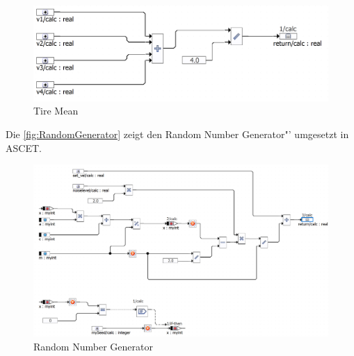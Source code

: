 \begin{figure}[h!]
	\centering
	\includegraphics[width=1\linewidth]{../Graphiken/TireMean.png}
	\caption{Tire Mean}
	\label{fig:TireMean}
\end{figure}

\pagebreak
Die \autoref{fig:RandomGenerator} zeigt den \glqq Random Number Generator"' umgesetzt in ASCET.

\begin{figure}[h!]
	\centering
	\includegraphics[width=1\linewidth]{../Graphiken/RandomGenerator.png}
	\caption{Random Number Generator}
	\label{fig:RandomGenerator}
\end{figure}